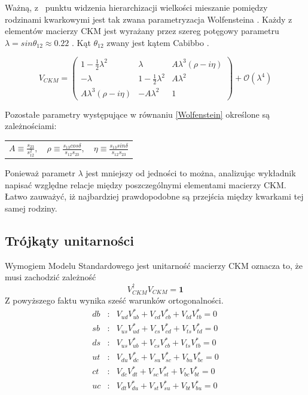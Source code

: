 Ważną, z~ punktu widzenia hierarchizacji wielkości mieszanie pomiędzy rodzinami kwarkowymi jest tak zwana parametryzacja Wolfensteina \cite{Wolfenstein}. Każdy z~ elementów macierzy CKM jest wyrażany przez szereg potęgowy parametru $\lambda=sin\theta_{12}\approx 0.22$ . Kąt $\theta_{12}$ zwany jest kątem Cabibbo \citep{perkins}.

\begin{equation}
V_{CKM}=\begin{pmatrix}
1-\frac{1}{2}\lambda^2& \lambda & A\lambda^3(\rho-i\eta)\\
-\lambda & 1-\frac{1}{2}\lambda^2 & A\lambda^2\\
 A\lambda^3(\rho-i\eta) & -A\lambda^2 & 1
\end{pmatrix} +\mathcal{O}(\lambda^4) 
\label{Wolfenstein}
\end{equation}

Pozostałe parametry występujące w równaniu \ref{Wolfenstein} określone są zależnościami:
\begin{center}
\begin{tabular}{l c r}
$A \equiv \frac{s_{23}}{s^2_{12}},$&  $\rho \equiv  \frac{s_{13}cos\delta}{s_{12}s_{23}},$ & $\eta  \equiv \frac{s_{13}sin\delta}{s_{12}s_{23}}$
\end{tabular}
\end{center}

Ponieważ parametr $\lambda$ jest mniejszy od jedności to można, analizując wykładnik napisać względne relacje między poszczególnymi elementami macierzy CKM. Łatwo zauważyć, iż najbardziej prawdopodobne są przejścia między kwarkami tej samej rodziny.
\subsection{Trójkąty unitarności}

Wymogiem Modelu Standardowego jest unitarność macierzy CKM oznacza to, że musi zachodzić zależność
\begin{equation}
V^{\dagger}_{CKM}V_{CKM}=\mathbf{1}
\end{equation}
Z powyższego faktu wynika sześć warunków ortogonalności.
\begin{eqnarray}
db&:&V_{ud}V^*_{ub}+V_{cd}V^*_{cb}+V_{td}V^*_{tb}=0 \label{db} \\
sb&:&V_{us}V^*_{ud}+V_{cs}V^*_{cd}+V_{ts}V^*_{td}=0  \\
ds&:&V_{us}V^*_{ub}+V_{cs}V^*_{cb}+V_{ts}V^*_{tb}=0  \\
ut&:&V_{du}V^*_{dc}+V_{su}V^*_{sc}+V_{bu}V^*_{bc}=0  \\
ct&:&V_{dc}V^*_{dt}+V_{sc}V^*_{st}+V_{bc}V^*_{bt}=0  \\
uc&:&V_{dt}V^*_{du}+V_{st}V^*_{su}+V_{bt}V^*_{bu}=0  
\end{eqnarray}


